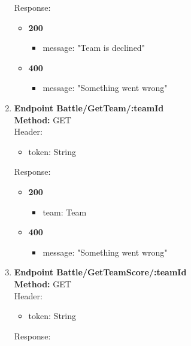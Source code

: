 \begin{enumerate}
\begin{itemize}
    \end{itemize}
    Response:\\
    \begin{itemize}
        \item \textbf{200} \\
        \begin{itemize}
            \item message: "Team is declined"
        \end{itemize}
        \item \textbf{400} \\
        \begin{itemize}
            \item message: "Something went wrong"
        \end{itemize}
    \end{itemize}
    \item \textbf{Endpoint Battle/GetTeam/:teamId} \\
    \textbf{Method:} GET \\
    Header:\\
    \begin{itemize}
        \item token: String
    \end{itemize}
    Response:\\
    \begin{itemize}
        \item \textbf{200} \\
        \begin{itemize}
            \item team: Team
        \end{itemize}
        \item \textbf{400} \\
        \begin{itemize}
            \item message: "Something went wrong"
        \end{itemize}
    \end{itemize}
    \item \textbf{Endpoint Battle/GetTeamScore/:teamId} \\
    \textbf{Method:} GET \\
    Header:\\
    \begin{itemize}
        \item token: String
    \end{itemize}
    Response:\\

\end{enumerate}
